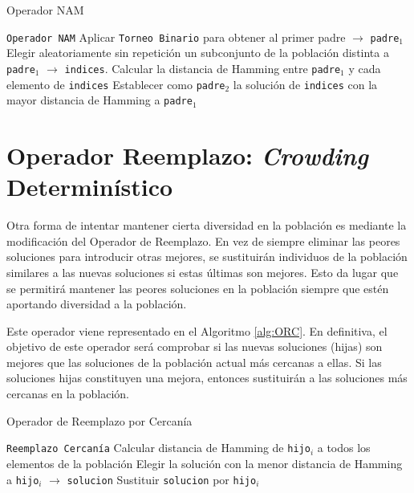 \begin{algorithm}
\caption{Operador NAM}\label{alg:NAM}
\begin{algorithmic}[1]
\Procedure \texttt{Operador NAM}
\State Aplicar \texttt{Torneo Binario} para obtener al primer padre $\xrightarrow{}{}$ \texttt{padre$_1$}
\State Elegir aleatoriamente sin repetición un subconjunto de la población distinta a \texttt{padre$_1$} $\xrightarrow{}{}$ \texttt{indices}.
\State Calcular la distancia de Hamming entre \texttt{padre$_1$} y cada elemento de \texttt{indices}
\State Establecer como \texttt{padre$_2$} la solución de \texttt{indices} con la mayor distancia de Hamming a \texttt{padre$_1$}
\EndProcedure
\end{algorithmic}
\end{algorithm}

\section{Operador Reemplazo: \textit{Crowding} Determinístico}


Otra forma de intentar mantener cierta diversidad en la población es mediante la modificación del Operador de Reemplazo. 
En vez de siempre eliminar las peores soluciones para introducir otras mejores, se sustituirán individuos de la población similares a las nuevas soluciones si estas últimas son mejores. 
Esto da lugar que se permitirá mantener las peores soluciones en la población siempre que estén aportando diversidad a la población.

Este operador \parencite{mahfoudCrowdingPreselectionRevisited1992} viene representado en el Algoritmo \ref{alg:ORC}. 
En definitiva, el objetivo de este operador será comprobar si las nuevas soluciones (hijas) son mejores que las soluciones de la población actual más cercanas a ellas. 
Si las soluciones hijas constituyen una mejora, entonces sustituirán a las soluciones más cercanas en la población. 

\begin{algorithm}
\caption{Operador de Reemplazo por Cercanía}\label{alg:ORC}
\begin{algorithmic}[1]
\Procedure \texttt{Reemplazo Cercanía}
	\State Calcular distancia de Hamming de \texttt{hijo$_i$} a todos los elementos de la población
	\State Elegir la solución con la menor distancia de Hamming a \texttt{hijo$_i$} $\xrightarrow{}{}$ \texttt{solucion}
		\State Sustituir \texttt{solucion} por \texttt{hijo$_i$}
	\EndIf
\EndFor
\EndProcedure
\end{algorithmic}
\end{algorithm}

